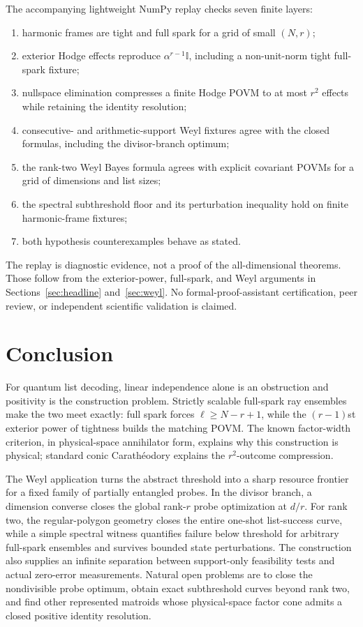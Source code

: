 \documentclass[11pt,a4paper]{article}
\newcommand{\I}{\mathbb{I}}
\begin{document}
The accompanying lightweight NumPy replay checks seven finite layers:
\begin{enumerate}[leftmargin=2em]
\item harmonic frames are tight and full spark for a grid of small $(N,r)$;
\item exterior Hodge effects reproduce $\alpha^{r-1}\I$, including a
non-unit-norm tight full-spark fixture;
\item nullspace elimination compresses a finite Hodge POVM to at most $r^2$
effects while retaining the identity resolution;
\item consecutive- and arithmetic-support Weyl fixtures agree with the closed
formulas, including the divisor-branch optimum;
\item the rank-two Weyl Bayes formula agrees with explicit covariant POVMs for
a grid of dimensions and list sizes;
\item the spectral subthreshold floor and its perturbation inequality hold on
finite harmonic-frame fixtures;
\item both hypothesis counterexamples behave as stated.
\end{enumerate}
The replay is diagnostic evidence, not a proof of the all-dimensional
theorems.  Those follow from the exterior-power, full-spark, and Weyl
arguments in Sections~\ref{sec:headline} and~\ref{sec:weyl}.  No
formal-proof-assistant certification, peer review, or independent scientific
validation is claimed.

\section{Conclusion}

For quantum list decoding, linear independence alone is an obstruction and
positivity is the construction problem.  Strictly scalable full-spark ray
ensembles make the two meet exactly: full spark forces
$\ell\ge N-r+1$, while the
$(r-1)$st exterior power of tightness builds the matching POVM.  The known
factor-width criterion, in physical-space annihilator form, explains why this
construction is physical; standard conic Carath\'eodory explains the
$r^2$-outcome compression.

The Weyl application turns the abstract threshold into a sharp resource
frontier for a fixed family of partially entangled probes.  In the divisor
branch, a dimension converse closes the global rank-$r$ probe optimization at
$d/r$.  For rank two, the regular-polygon geometry closes the entire one-shot
list-success curve, while a simple spectral witness quantifies failure below
threshold for arbitrary full-spark ensembles and survives bounded state
perturbations.  The construction also supplies an infinite separation between
support-only feasibility tests and actual zero-error measurements.  Natural
open problems are to close the nondivisible probe optimum, obtain exact
subthreshold curves beyond rank two, and find other represented matroids whose
physical-space factor cone admits a closed positive identity resolution.
\end{document}
